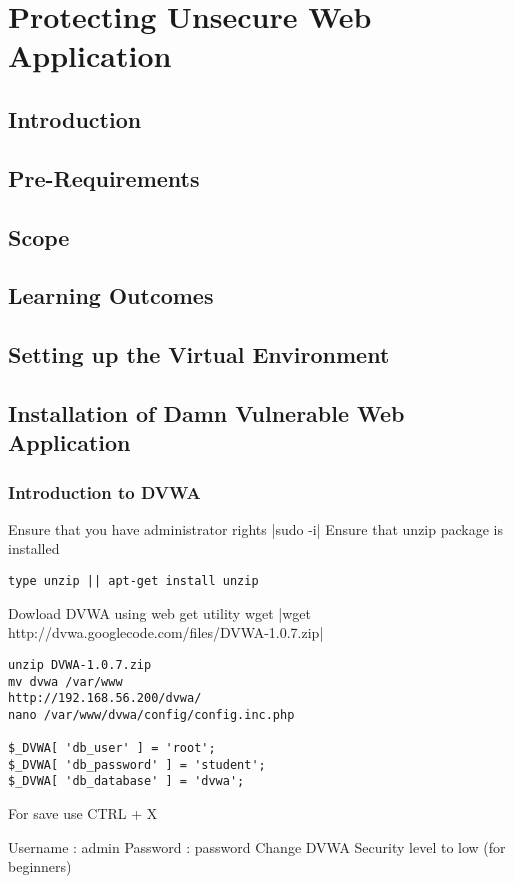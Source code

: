 \chapter{Protecting Unsecure Web Application}
\label{Protecting Unsecure Web Application}
\section{Introduction}
\section{Pre-Requirements} 
\section{Scope}
\section{Learning Outcomes} 
\section{Setting up the Virtual Environment}
\section{Installation of Damn Vulnerable Web Application}
\subsection{Introduction to DVWA}

Ensure that you have administrator rights
|sudo -i|
Ensure that unzip package is installed
\begin{verbatim}
type unzip || apt-get install unzip
\end{verbatim}
Dowload DVWA using web get utility wget
|wget http://dvwa.googlecode.com/files/DVWA-1.0.7.zip|

\begin{verbatim}
unzip DVWA-1.0.7.zip
mv dvwa /var/www
http://192.168.56.200/dvwa/
nano /var/www/dvwa/config/config.inc.php

$_DVWA[ 'db_user' ] = 'root';
$_DVWA[ 'db_password' ] = 'student';
$_DVWA[ 'db_database' ] = 'dvwa';
\end{verbatim}
For save use  CTRL + X

Username : admin
Password : password
Change DVWA Security level to low (for beginners)


